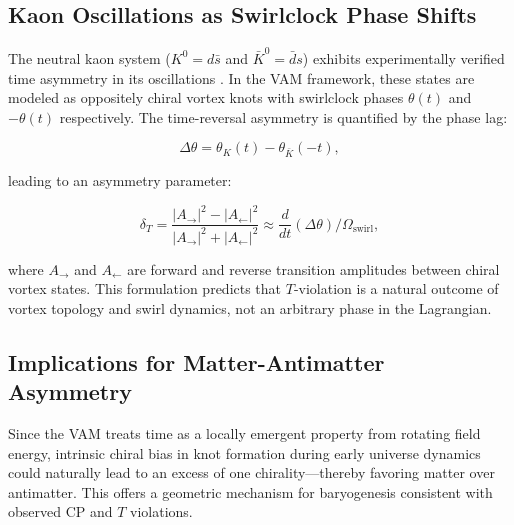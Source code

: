 \subsection{Kaon Oscillations as Swirlclock Phase Shifts}

The neutral kaon system ($K^0 = d\bar{s}$ and $\bar{K}^0 = \bar{d}s$) exhibits experimentally verified time asymmetry in its oscillations \cite{christenson1964evidence,cplear1998tviolation}. In the VAM framework, these states are modeled as oppositely chiral vortex knots with swirlclock phases $\theta(t)$ and $-\theta(t)$ respectively. The time-reversal asymmetry is quantified by the phase lag:

\begin{equation}
\Delta \theta = \theta_K(t) - \theta_{\bar{K}}(-t),
\end{equation}

leading to an asymmetry parameter:

\begin{equation}
\delta_T = \frac{|A_{\rightarrow}|^2 - |A_{\leftarrow}|^2}{|A_{\rightarrow}|^2 + |A_{\leftarrow}|^2} \approx \frac{d}{dt} (\Delta \theta) \Big/ \Omega_{\text{swirl}},
\end{equation}

where $A_{\rightarrow}$ and $A_{\leftarrow}$ are forward and reverse transition amplitudes between chiral vortex states. This formulation predicts that $T$-violation is a natural outcome of vortex topology and swirl dynamics, not an arbitrary phase in the Lagrangian.

\subsection{Implications for Matter-Antimatter Asymmetry}

Since the VAM treats time as a locally emergent property from rotating field energy, intrinsic chiral bias in knot formation during early universe dynamics could naturally lead to an excess of one chirality—thereby favoring matter over antimatter. This offers a geometric mechanism for baryogenesis consistent with observed CP and $T$ violations.

